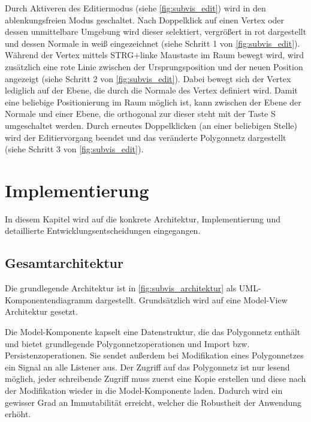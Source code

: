 Durch Aktiveren des Editiermodus (siehe \autoref{fig:subvis_edit}) wird in den ablenkungsfreien Modus geschaltet.
Nach Doppelklick auf einen Vertex oder dessen unmittelbare Umgebung wird dieser selektiert, vergrößert in rot dargestellt und dessen Normale in weiß eingezeichnet (siehe Schritt 1 von \autoref{fig:subvis_edit}).
Während der Vertex mittels STRG+linke Maustaste im Raum bewegt wird, wird zusätzlich eine rote Linie zwischen der Ursprungsposition und der neuen Position angezeigt (siehe Schritt 2 von \autoref{fig:subvis_edit}).
Dabei bewegt sich der Vertex lediglich auf der Ebene, die durch die Normale des Vertex definiert wird.
Damit eine beliebige Positionierung im Raum möglich ist, kann zwischen der Ebene der Normale und einer Ebene, die orthogonal zur dieser steht mit der Taste S umgeschaltet werden.
Durch erneutes Doppelklicken (an einer beliebigen Stelle) wird der Editiervorgang beendet und das veränderte Polygonnetz dargestellt (siehe Schritt 3 von \autoref{fig:subvis_edit}).


\section{Implementierung}

In diesem Kapitel wird auf die konkrete Architektur, Implementierung und detaillierte Entwicklungsentscheidungen eingegangen.

\subsection{Gesamtarchitektur}

Die grundlegende Architektur ist in \autoref{fig:subvis_architektur} als UML-Komponentendiagramm dargestellt. 
Grundsätzlich wird auf eine Model-View Architektur gesetzt.

Die Model-Komponente kapselt eine Datenstruktur, die das Polygonnetz enthält und bietet grundlegende Polygonnetzoperationen und Import bzw. Persistenzoperationen.
Sie sendet außerdem bei Modifikation eines Polygonnetzes ein Signal an alle Listener aus.
Der Zugriff auf das Polygonnetz ist nur lesend möglich, jeder schreibende Zugriff muss zuerst eine Kopie erstellen und diese nach der Modifikation wieder in die Model-Komponente laden.
Dadurch wird ein gewisser Grad an Immutabilität erreicht, welcher die Robustheit der Anwendung erhöht.

